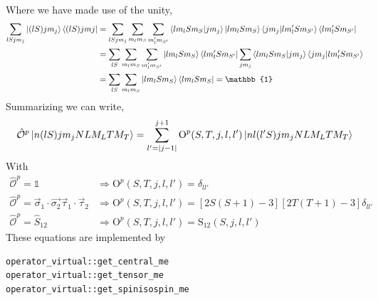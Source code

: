 \documentclass[10pt]{article}
\begin{document}
Where we have made use of the unity,
\begin{align*}
\sum_{l S j m_j} \ket{ (l S) j m_j} \bra{ (l S) j mj} &= \sum_{l S j m_j} \sum_{ 
m_l m_S} \sum_{m_l' m_{S'}} \braket{ l m_l S m_S | j m_j } \ket{ l m_l S m_S} 
\braket{ j m_j | l m_l' S m_{S'}} \bra{ l m_l' S m_{S'}} \\
&= \sum_{l S} \sum_{ m_l m_S} \sum_{m_l' m_{S'}}  \ket{ l m_l S m_S}  \bra{ l 
m_l' S m_{S'}} \sum_{j m_j} \braket{ l m_l S m_S | j m_j } \braket{ j m_j | l 
m_l' S m_{S'}} \\
&=  \sum_{l S} \sum_{ m_l m_S} \ket{ l m_l S m_S}  \bra{ l m_l S m_S} = 
\mathbb{1}
\end{align*}
Summarizing we can write,
\begin{align*}
	\hat{\mathcal{O}}^{p} \ket{ n (lS) j m_j N L M_L T M_T } = \sum_{l' = 
|j-1|}^{j+1} \text{O}^{p}(S,T,j,l,l') \ket{ nl (l'S) j m_j N L M_L T M_T }
\end{align*}
With
\begin{align}
	\hat{\mathcal{O}}^{p} = \mathbb{1} & \Rightarrow  
\text{O}^{p}(S,T,j,l,l') = \delta_{l l'} \\
	\hat{\mathcal{O}}^{p} = \vec{\sigma}_{1} \cdot \vec{\sigma_{2}} \vec{ 
\tau}_{1} \cdot \vec{ \tau}_{2} & \Rightarrow  \text{O}^{p}(S,T,j,l,l') = [ 
2S(S+1) - 3 ] [ 2T(T+1) - 3] \delta_{l l'}\\
	\hat{\mathcal{O}}^{p} =  \hat{S}_{12} &\Rightarrow 
\text{O}^{p}(S,T,j,l,l') = \text{S}_{12}(S,j,l,l')
\end{align}
These equations are implemented by
\begin{verbatim}
operator_virtual::get_central_me
operator_virtual::get_tensor_me
operator_virtual::get_spinisospin_me
\end{verbatim}
\end{document}
